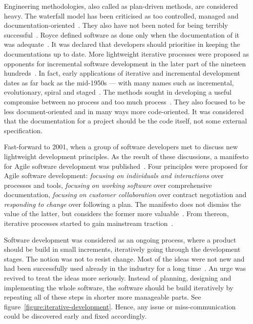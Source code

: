 \documentclass[english]{tktltiki2}
\begin{document}
Engineering methodologies, also called as plan-driven methods, are considered heavy. The waterfall model has been criticised as too controlled, managed and documentation-oriented~\cite{Boe88, LB03, Fow05}. They also have not been noted for being terribly successful~\cite{Fow05}. Royce defined software as done only when the documentation of it was adequate~\cite{Roy70}. It was declared that developers should prioritise in keeping the documentations up to date. More lightweight iterative processes were proposed as opponents for incremental software development in the later part of the nineteen hundreds~\cite{LB03}. In fact, early applications of iterative and incremental development dates as far back as the mid-1950s — with many names such as incremental, evolutionary, spiral and staged~\cite{Boe88, LB03, Fow05}. The methods sought in developing a useful compromise between no process and too much process~\cite{Fow05}. They also focused to be less document-oriented and in many ways more code-oriented. It was considered that the documentation for a project should be the code itself, not some external specification.

Fast-forward to 2001, when a group of software developers met to discuss new lightweight development principles. As the result of these discussions, a manifesto for Agile software development was published~\cite{BBB01a}. Four principles were proposed for Agile software development: \emph{focusing on individuals and interactions} over processes and tools, \emph{focusing on working software} over comprehensive documentation, \emph{focusing on customer collaboration} over contract negotiation and \emph{responding to change} over following a plan. The manifesto does not dismiss the value of the latter, but considers the former more valuable~\cite{BBB01a}. From thereon, iterative processes started to gain mainstream traction~\cite{LB03, Fow05}.

Software development was considered as an ongoing process, where a product should be build in small increments, iteratively going through the development stages. The notion was not to resist change. Most of the ideas were not new and had been successfully used already in the industry for a long time~\cite{Fow05}. An urge was revived to treat the ideas more seriously. Instead of planning, designing and implementing the whole software, the software should be build iteratively by repeating all of these steps in shorter more manageable parts. See figure~\ref{figure:iterative-development}. Hence, any issue or miss-communication could be discovered early and fixed accordingly.
\end{document}
